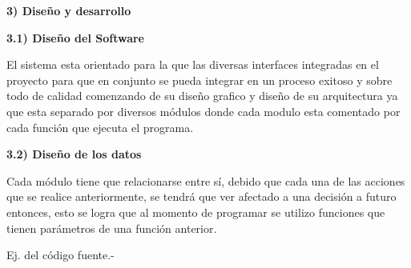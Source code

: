 \documentclass{article} %
\begin{document}
\noindent 

\noindent \textbf{3) Dise\~{n}o y desarrollo}

\noindent \textbf{           3.1) Dise\~{n}o del Software}

\noindent El sistema esta orientado para la que las diversas interfaces integradas en el proyecto para que en conjunto se pueda integrar en un proceso exitoso y sobre todo de calidad comenzando de su dise\~{n}o grafico y dise\~{n}o de su arquitectura ya que esta separado por diversos m\'{o}dulos donde cada modulo esta comentado por cada funci\'{o}n que ejecuta el programa.

\noindent \textbf{    3.2) Dise\~{n}o de los datos}

\noindent Cada m\'{o}dulo tiene que relacionarse entre s\'{i}, debido que cada una de las acciones que se realice anteriormente, se tendr\'{a} que ver afectado a una decisi\'{o}n a futuro entonces, esto se logra que al momento de programar se utilizo funciones que tienen par\'{a}metros de una funci\'{o}n anterior.

\noindent Ej. del c\'{o}digo fuente.-
\end{document}

